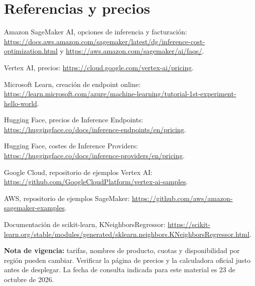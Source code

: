 \documentclass[11pt,a4paper]{article}
\begin{document}
\section*{Referencias y precios}
\begin{enumerate}[label={[\arabic*]}]
  \item Amazon SageMaker AI, opciones de inferencia y facturación: \url{https://docs.aws.amazon.com/sagemaker/latest/dg/inference-cost-optimization.html} y \url{https://aws.amazon.com/sagemaker/ai/faqs/}.
  \item Vertex AI, precios: \url{https://cloud.google.com/vertex-ai/pricing}.
  \item Microsoft Learn, creación de endpoint online: \url{https://learn.microsoft.com/azure/machine-learning/tutorial-1st-experiment-hello-world}.
  \item Hugging Face, precios de Inference Endpoints: \url{https://huggingface.co/docs/inference-endpoints/en/pricing}.
  \item Hugging Face, costes de Inference Providers: \url{https://huggingface.co/docs/inference-providers/en/pricing}.
  \item Google Cloud, repositorio de ejemplos Vertex AI: \url{https://github.com/GoogleCloudPlatform/vertex-ai-samples}.
  \item AWS, repositorio de ejemplos SageMaker: \url{https://github.com/aws/amazon-sagemaker-examples}.
  \item Documentación de scikit-learn, KNeighborsRegressor: \url{https://scikit-learn.org/stable/modules/generated/sklearn.neighbors.KNeighborsRegressor.html}.
\end{enumerate}
\bigskip
\noindent\textbf{Nota de vigencia:} tarifas, nombres de producto, cuotas y disponibilidad por región pueden cambiar. Verificar la página de precios y la calculadora oficial justo antes de desplegar. La fecha de consulta indicada para este material es 23 de octubre de 2026.
\end{document}
